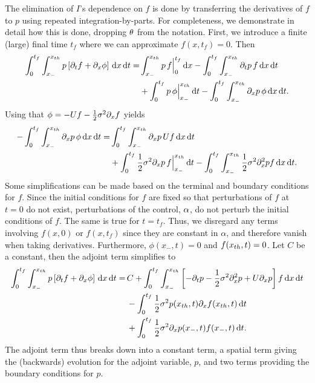 \documentclass[12pt]{article}
\def \tf {{t_f}}
\begin{document}
The elimination of $I$'s dependence on $f$ is done by transferring the
derivatives of $f$ to $p$ using repeated integration-by-parts. For completeness,
we demonstrate in detail how this is done, dropping ${\theta}$ from the
notation. First, we introduce a finite (large) final time $\tf$
where we can approximate $f(x,\tf)=0$. Then
\begin{align*}
\int_0^{\tf} \int_{x_-}^{\xth}
p  \left[\di_t f  + \di_x \phi\right]
	\intd{x}\intd{t} 
=& 
\int_{x_-}^{\xth} p \, f \Big|_0^{\tf} \intd{x} -
\int_0^{\tf}\int_{x_-}^{\xth} \di_tp \,  f \intd{x}\intd{t}  
\\
&+ \int_{0}^{\tf} p\, \phi   \Big|_{x_-}^{\xth} \intd{t}
-  \int_0^{\tf}\int_{x_-}^{\xth} \di_xp \,  \phi
\intd{x}\intd{t}.
\end{align*}
Using that $\phi = -Uf-\frac12 \sigma^2 {\partial}_xf$ yields
\begin{align*}
-  \int_0^{\tf}\int_{x_-}^{\xth} \di_xp \,  \phi
\intd{x}\intd{t}
=&
 \int_0^{\tf}\int_{x_-}^{\xth} \di_xp \,  U f\intd{x}\intd{t}
\\
&+  
\int_{0}^{\tf} \frac{1 }{2}\s^2\di_xp\, f \Big|_{x_-}^{\xth} \intd{t} -
\int_0^{\tf}\int_{x_-}^{\xth} \frac{1 }{2}\s^2\di^2_xp   f\intd{x}\intd{t}.
\end{align*}
Some simplifications can be made based on the terminal and boundary
conditions for $f$. Since the initial conditions for $f$ are fixed so that perturbations of
  $f$ at $t=0$ do not exist, perturbations of the  control, ${\alpha}$,
  do not perturb the initial conditions of $f$. The same is true for $t=\tf$. Thus, we disregard any
  terms involving $f(x,0)$ or $f(x,\tf)$ since they are constant in
  $\alpha$, and therefore vanish when taking derivatives. Furthermore, $\phi(x_-, t)=0$ and
  $f({ x_{th} }, t) = 0$. Let $C$ be a constant, then the adjoint term
  simplifies to 
\begin{align*}
\int_0^{\tf} \int_{x_-}^{\xth}
p  \left[\di_t f  + \di_x \phi\right]
	\intd{x}\intd{t} 
= & \, C+
\int_0^{\tf}\int_{x_-}^{\xth} 
	\left[-\di_tp -  \frac{1 }{2}\s^2\di^2_xp + U \di_xp \right]  f
\intd{x}\intd{t}
\\ 
& \, - \int_{0}^{\tf} \frac{1 }{2}\s^2 p(\xth,t)  \di_xf(\xth,t) \intd{t}
\\
& \, + \int_{0}^{\tf} \frac{1 }{2}\s^2\di_xp(x_-,t)  f(x_-,t) \intd{t}.
\end{align*}
The adjoint term thus breaks down into a constant term, a spatial
term giving the (backwards) evolution for the adjoint variable, $p$,
and two terms providing the boundary conditions for $p$. 
\end{document}

